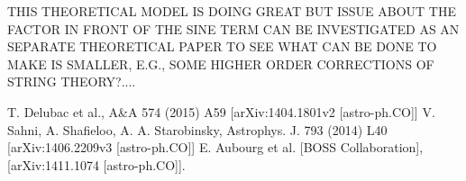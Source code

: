 \documentclass[11pt,a4paper]{article}
\begin{document}
THIS THEORETICAL MODEL IS DOING GREAT BUT ISSUE ABOUT THE FACTOR IN FRONT OF THE SINE TERM CAN BE INVESTIGATED AS AN SEPARATE THEORETICAL PAPER TO SEE WHAT CAN BE DONE TO MAKE IS SMALLER, E.G., SOME HIGHER ORDER CORRECTIONS OF STRING THEORY?....

\begin{thebibliography}{*}
T. Delubac et al., A\&A 574 (2015) A59 [arXiv:1404.1801v2 [astro-ph.CO]]
V. Sahni, A. Shafieloo, A. A. Starobinsky, Astrophys. J. 793 (2014) L40 [arXiv:1406.2209v3 [astro-ph.CO]]
E. Aubourg et al. [BOSS Collaboration], [arXiv:1411.1074 [astro-ph.CO]].






\end{thebibliography}
\end{document}
